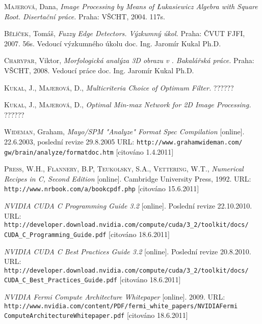 \begin{thebibliography}{99}
        \textsc{Majerová}, Dana, \textit{Image Processing by Means of \L ukasiewicz Algebra with Square Root.
        Disertační práce.} Praha: VŠCHT, 2004. 117s.

         \textsc{Bělíček}, Tomáš, \textit{Fuzzy Edge Detectors.
        Výzkumný úkol.} Praha: ČVUT FJFI, 2007. 56s. Vedoucí výzkumného úkolu doc. Ing. Jaromír Kukal Ph.D.

         \textsc{Charypar}, Viktor, \textit{Morfologická analýza 3D obrazu v \Cpp.
        Bakalářská práce.} Praha: VŠCHT, 2008. Vedoucí práce doc. Ing. Jaromír Kukal Ph.D.

        \textsc{Kukal}, J., \textsc{Majerová}, D., \textit{Multicriteria Choice of Optimum Filter.
        } ??????

        \textsc{Kukal}, J., \textsc{Majerová}, D., \textit{Optimal Min-max Network for 2D Image Processing.
        } ??????

        \textsc{Wideman}, Graham, \textit{Mayo/SPM "Analyze" Format Spec Compilation} [online]. 22.6.2003, poslední revize 29.8.2005
        URL: \texttt{http://www.grahamwideman.com/} {\tt gw/brain/analyze/formatdoc.htm} [citováno 1.4.2011]

        \textsc{Press}, W.H., \textsc{Flannery}, B.P, \textsc{Teukolsky}, S.A., \textsc{Vettering}, W.T.,
        \textit{Numerical Recipes in C, Second Edition} [online]. Cambridge University Press, 1992.
        URL: {\tt http://www.nrbook.com/a/bookcpdf.php} [citováno 15.6.2011]

        \textit{NVIDIA CUDA C Programming Guide 3.2} [online]. Poslední revize 22.10.2010.
        URL: {\tt http://developer.download.nvidia.com/compute/cuda/3\_2/toolkit/docs/} {\tt CUDA\_C\_Programming\_Guide.pdf} [citováno 18.6.2011]

        \textit{NVIDIA CUDA C Best Practices Guide 3.2} [online]. Poslední revize 20.8.2010.
        URL: {\tt  http://developer.download.nvidia.com/compute/cuda/3\_2/toolkit/docs/} {\tt CUDA\_C\_Best\_Practices\_Guide.pdf} [citováno 18.6.2011]

        \textit{NVIDIA Fermi Compute Architecture Whitepaper} [online]. 2009.
        URL: {\tt http://www.nvidia.com/content/PDF/fermi\_white\_papers/NVIDIAFermi} {\tt ComputeArchitectureWhitepaper.pdf} [citováno 18.6.2011]


\end{thebibliography}
